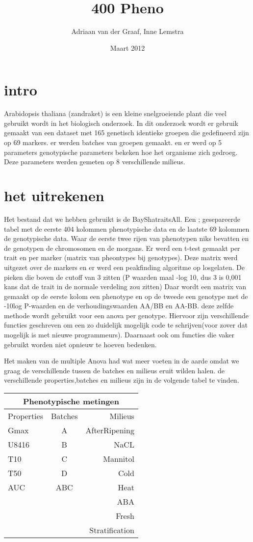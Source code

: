 \documentclass[10pt,a4paper]{article}
\author{Adriaan van der Graaf, Inne Lemstra}
\title{400 Pheno}
\date{Maart 2012}
\begin{document}
  \maketitle
\section  {intro}
Arabidopsis thaliana (zandraket) is een kleine snelgroeiende plant die veel gebruikt wordt in het biologisch onderzoek.
In dit onderzoek wordt er gebruik gemaakt van een dataset met 165 genetisch identieke groepen die gedefineerd zijn op 69 markers.
er werden batches van groepen gemaakt. en er werd op 5 parameters genotypische parameters bekeken hoe het organisme zich gedroeg.
Deze parameters werden gemeten op 8 verschillende milieus.\\

\section{het uitrekenen}
Het bestand dat we hebben gebruikt is de BayShatraitsAll. 
Een ; gesepareerde tabel met de eerste 404 kolommen phenotypische data en de laatste 69 kolommen de genotypische data.
Waar de eerste twee rijen van phenotypen niks bevatten en de genotypen de chromosomen en de morgans.
Er werd een t-test gemaakt per trait en per marker (matrix van pheontypes bij genotypes).
Deze matrix werd uitgezet over de markers en er werd een peakfinding algoritme op losgelaten. 
De pieken die boven de cutoff van 3 zitten (P waarden maal -log 10, dus 3 is 0,001 kans dat de trait in de normale verdeling zou zitten)
Daar wordt een matrix van gemaakt op de eerste kolom een phenotype en op de tweede een genotype met de -10log P-waarden en de  verhoudingswaarden AA/BB en AA-BB.
deze zelfde methode wordt gebruikt voor een anova per genotype. 
Hiervoor zijn verschillende functies geschreven om een zo duidelijk mogelijk code te schrijven(voor zover dat mogelijk is met nieuwe programmeurs).
Daarnaast ook om functies die vaker gebruikt worden niet opnieuw te hoeven bedenken.

Het maken van de multiple Anova had wat meer voeten in de aarde omdat we graag de verschillende tussen de batches en milieus eruit wilden halen.
de verschillende properties,batches en milieus zijn in de volgende tabel te vinden.\\
\begin{tabular} {l | c | r}
\multicolumn{3}{c}{Phenotypische metingen} \\
\hline
Properties & Batches & Milieus\\ 
\hline \hline
Gmax & A & AfterRipening\\
U8416 & B & NaCL\\
T10 & C & Mannitol\\
T50 & D & Cold\\
AUC & ABC & Heat\\
 &  & ABA\\
 &  & Fresh\\
 &  & Stratification\\
 \hline
\end{tabular}
\end{document}
